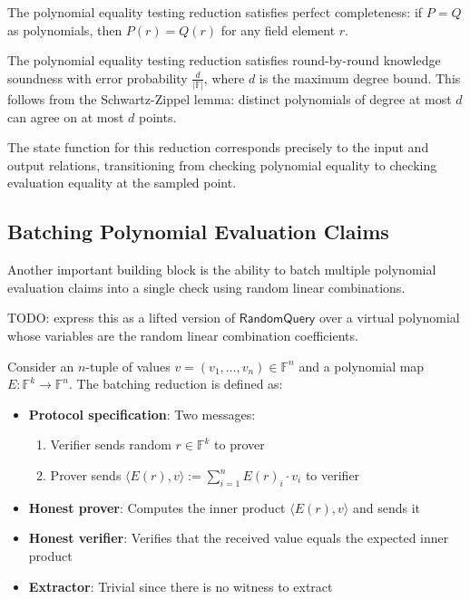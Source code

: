 \begin{theorem}
    The polynomial equality testing reduction satisfies perfect completeness: if $P = Q$ as polynomials, then $P(r) = Q(r)$ for any field element $r$.
\end{theorem}

\begin{theorem}
    The polynomial equality testing reduction satisfies round-by-round knowledge soundness with error probability $\frac{d}{|\mathbb{F}|}$, where $d$ is the maximum degree bound. This follows from the Schwartz-Zippel lemma: distinct polynomials of degree at most $d$ can agree on at most $d$ points.
\end{theorem}

The state function for this reduction corresponds precisely to the input and output relations, transitioning from checking polynomial equality to checking evaluation equality at the sampled point.

\subsection{Batching Polynomial Evaluation Claims}

Another important building block is the ability to batch multiple polynomial evaluation claims into a single check using random linear combinations.

TODO: express this as a lifted version of $\mathsf{RandomQuery}$ over a virtual polynomial whose
variables are the random linear combination coefficients.

\begin{definition}
    \label{def:batching_polynomial_evaluation}
    Consider an $n$-tuple of values $v = (v_1, \ldots, v_n) \in \mathbb{F}^n$ and a polynomial map $E : \mathbb{F}^k \to \mathbb{F}^n$. The batching reduction is defined as:
    \begin{itemize}
        \item \textbf{Protocol specification}: Two messages:
        \begin{enumerate}
            \item Verifier sends random $r \in \mathbb{F}^k$ to prover
            \item Prover sends $\langle E(r), v \rangle := \sum_{i=1}^n E(r)_i \cdot v_i$ to verifier
        \end{enumerate}
        \item \textbf{Honest prover}: Computes the inner product $\langle E(r), v \rangle$ and sends it
        \item \textbf{Honest verifier}: Verifies that the received value equals the expected inner product
        \item \textbf{Extractor}: Trivial since there is no witness to extract
    \end{itemize}
\end{definition}

